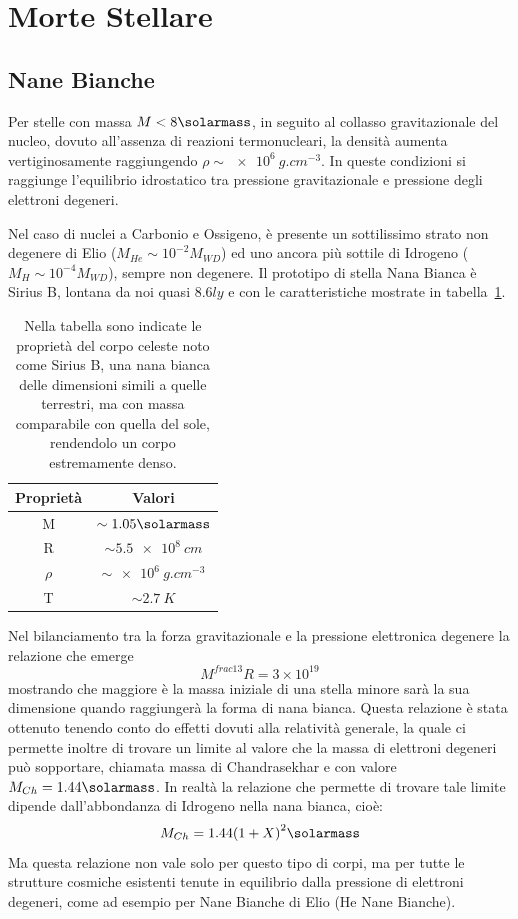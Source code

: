 \section{Morte Stellare}\label{sec:morte-stellare}
\subsection{Nane Bianche}\label{sec:nane-bianche}
Per stelle con massa $M < 8\si{\solarmass}$, in seguito al collasso gravitazionale del nucleo, dovuto all'assenza di reazioni termonucleari, la densità aumenta vertiginosamente raggiungendo $\rho \sim \SI{e6}{g.cm^{-3}}$. In queste condizioni si raggiunge l'equilibrio idrostatico tra pressione gravitazionale e pressione degli elettroni degeneri.

Nel caso di nuclei a Carbonio e Ossigeno, è presente un sottilissimo strato non degenere di Elio ($M_{He} \sim 10^{-2} M_{WD}$) ed uno ancora più sottile di Idrogeno ($M_{H} \sim 10^{-4} M_{WD}$), sempre non degenere. Il prototipo di stella Nana Bianca è Sirius B, lontana da noi quasi $8.6 \si{ly}$ e con le caratteristiche mostrate in tabella~\ref{tab:sirius-b}.

\begin{table}
    \centering
    \caption{Nella tabella sono indicate le proprietà del corpo celeste noto come Sirius B, una nana bianca delle dimensioni simili a quelle terrestri, ma con massa comparabile con quella del sole, rendendolo un corpo estremamente denso.}\label{tab:sirius-b}
    \begin{tabular}{c|c}
        \toprule
        Proprietà & Valori\\
        \midrule
        M & $\sim 1.05 \si{\solarmass}$\\
        R & $\sim \SI{5.5 e8}{cm}$\\
        $\rho$ & $\sim \SI{e6}{g.cm^{-3}}$\\
        T & $\sim \SI{2.7}{K}$\\
        \bottomrule
    \end{tabular}
\end{table}

Nel bilanciamento tra la forza gravitazionale e la pressione elettronica degenere la relazione che emerge
\[
    M^{frac{1}{3}}R = 3\times 10^{19}
\]
mostrando che maggiore è la massa iniziale di una stella minore sarà la sua dimensione quando raggiungerà la forma di nana bianca. Questa relazione è stata ottenuto tenendo conto do effetti dovuti alla relatività generale, la quale ci permette inoltre di trovare un limite al valore che la massa di elettroni degeneri può sopportare, chiamata massa di Chandrasekhar e con valore $M_{Ch} = 1.44\si{\solarmass}$. In realtà la relazione che permette di trovare tale limite dipende dall'abbondanza di Idrogeno nella nana bianca, cioè:
\[
    M_{Ch} = 1.44{(1+X)}^2 \si{\solarmass}
\]
Ma questa relazione non vale solo per questo tipo di corpi, ma per tutte le strutture cosmiche esistenti tenute in equilibrio dalla pressione di elettroni degeneri, come ad esempio per Nane Bianche di Elio (He Nane Bianche).


